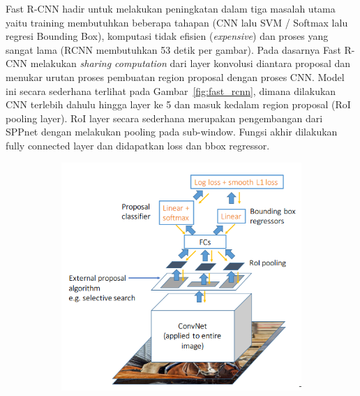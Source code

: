 Fast R-CNN hadir untuk melakukan peningkatan dalam tiga masalah utama yaitu training membutuhkan beberapa tahapan (CNN lalu SVM / Softmax lalu regresi Bounding Box), komputasi tidak efisien (\textit{expensive}) dan proses yang sangat lama (RCNN membutuhkan 53 detik per gambar). Pada dasarnya Fast R-CNN melakukan \textit{sharing computation} dari layer konvolusi diantara proposal dan menukar urutan proses pembuatan region proposal dengan proses CNN. Model ini secara sederhana terlihat pada Gambar~\ref{fig:fast_rcnn}, dimana dilakukan CNN terlebih dahulu hingga layer ke 5 dan masuk kedalam region proposal (RoI pooling layer). RoI layer secara sederhana merupakan pengembangan dari SPPnet dengan melakukan pooling pada sub-window. Fungsi akhir dilakukan fully connected layer dan didapatkan loss dan bbox regressor.

\begin{figure}[ht]
  \centering
  \begin{subfigure}[b]{0.47\textwidth}
    \includegraphics[width=\textwidth]{scheme-rcnn}
    \caption{}
    \label{fig:fast}   
  \end{subfigure}             
  \begin{subfigure}[b]{0.47\textwidth}

\end{subfigure}
\end{figure}
